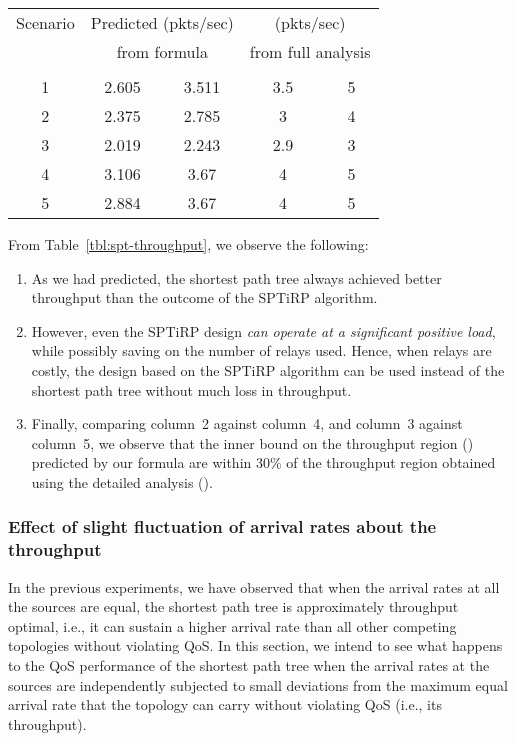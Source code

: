 \documentclass[12pt, draftclsnofoot, onecolumn]{IEEEtran}
\begin{document}
\begin{table*}[ht]
  \centering
\caption{Throughput comparison of the shortest path tree and the SPTiRP design}
\label{tbl:spt-throughput}
\footnotesize
  \begin{tabular}{|c|c|c|c|c|}\hline
    Scenario & \multicolumn{2}{c|}{Predicted (pkts/sec)} & \multicolumn{2}{c|}{(pkts/sec)} \\
             & \multicolumn{2}{c|}{from formula} & \multicolumn{2}{c|}{from full analysis}\\
              
             &   &  &  & \\
 \hline
    1 & 2.605 & 3.511 & 3.5 & 5\\
 \hline
    2 & 2.375 & 2.785 & 3 & 4\\
 \hline
    3 & 2.019 & 2.243 & 2.9 & 3\\
 \hline
    4 & 3.106 & 3.67 & 4 & 5\\
 \hline
    5 & 2.884 & 3.67 & 4 & 5\\
\hline
\end{tabular}
\normalsize
\end{table*}

From Table~\ref{tbl:spt-throughput}, we observe the following:

\begin{enumerate}
\item As we had predicted, the shortest path tree always achieved better throughput than the outcome of the SPTiRP algorithm.
\item However, even the SPTiRP design \emph{can operate at a significant positive load}, while possibly saving on the number of relays used. Hence, when relays are costly, the design based on the SPTiRP algorithm can be used instead of the shortest path tree without much loss in throughput.
\item Finally, comparing column~2 against column~4, and column~3 against column~5, we observe that the inner bound on the throughput region () predicted by our formula are within 30\% of the throughput region obtained using the detailed analysis ().
\end{enumerate}

\subsubsection{Effect of slight fluctuation of arrival rates about the throughput}
In the previous experiments, we have observed that when the arrival rates at all the sources are equal, the shortest path tree is approximately throughput optimal, i.e., it can sustain a higher arrival rate than all other competing topologies without violating QoS. In this section, we intend to see what happens to the QoS performance of the shortest path tree when the arrival rates at the sources are independently subjected to small deviations from the maximum equal arrival rate that the topology can carry without violating QoS (i.e., its throughput).   
\end{document}
